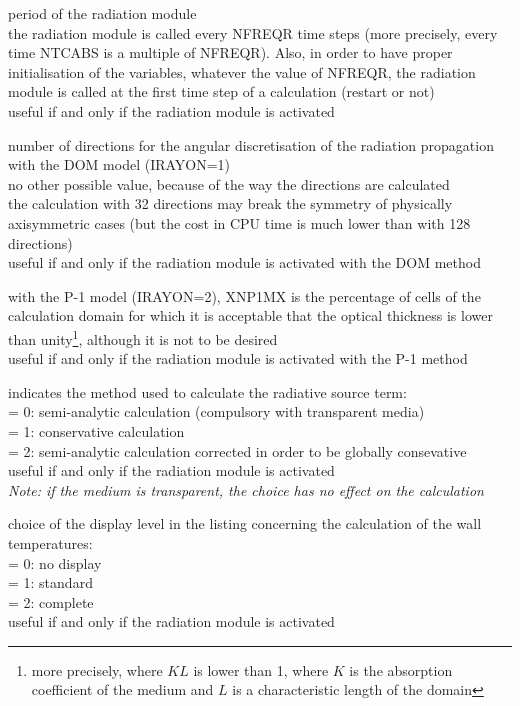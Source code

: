 {period of the radiation module\\
the radiation module is called every NFREQR time steps (more precisely, every
time NTCABS is a multiple of NFREQR). Also, in order to have proper
initialisation of the variables, whatever the value of NFREQR, the radiation
module is called at the first time step of a calculation (restart or not)\\
useful if and only if the radiation module is activated}

{number of directions for the angular discretisation of the radiation
propagation with the DOM model (IRAYON=1)\\
no other possible value, because of the way the directions are calculated\\
the calculation with 32 directions may break the symmetry of
physically axisymmetric cases (but the cost in CPU time is much lower
 than with 128 directions)\\
useful if and only if the radiation module is activated with the DOM method}

{with the P-1 model (IRAYON=2), XNP1MX is the percentage of cells of
the calculation domain for which it is acceptable that the optical
thickness is lower than unity\footnote{more precisely, where $KL$ is lower than
1, where $K$ is the absorption coefficient of the medium and $L$ is a
characteristic length of the domain}, although it is not to be desired\\
useful if and only if the radiation module is activated with the P-1 method}

{indicates the method used to calculate the radiative source term:\\
\hspace*{1.3cm}= 0: semi-analytic calculation (compulsory with transparent
media)\\
\hspace*{1.3cm}= 1: conservative calculation\\
\hspace*{1.3cm}= 2: semi-analytic calculation corrected in order to be
globally consevative\\
useful if and only if the radiation module is activated\\
{\em Note: if the medium is transparent, the choice has no effect on the calculation}}

{choice of the display level in the listing concerning the calculation of
the wall temperatures:\\
\hspace*{1.3cm}= 0: no display\\
\hspace*{1.3cm}= 1: standard\\
\hspace*{1.3cm}= 2: complete\\
useful if and only if the radiation module is activated}


